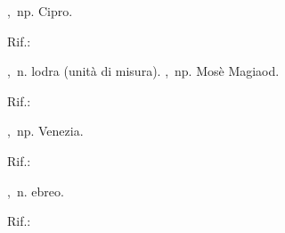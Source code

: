 

,\ np.
Cipro.
\begin{subvocedue}
\item[Rif.:] 
\end{subvocedue}

,\ n.
lodra (unità di misura).
,\ np.
Mosè Magiaod.
\begin{subvocedue}
\item[Rif.:] 
\end{subvocedue}
,\ np.
Venezia.
\begin{subvocedue}
\item[Rif.:] 
\end{subvocedue}

,\ n.
ebreo.
\begin{subvocedue}
\item[Rif.:] 
\end{subvocedue}
